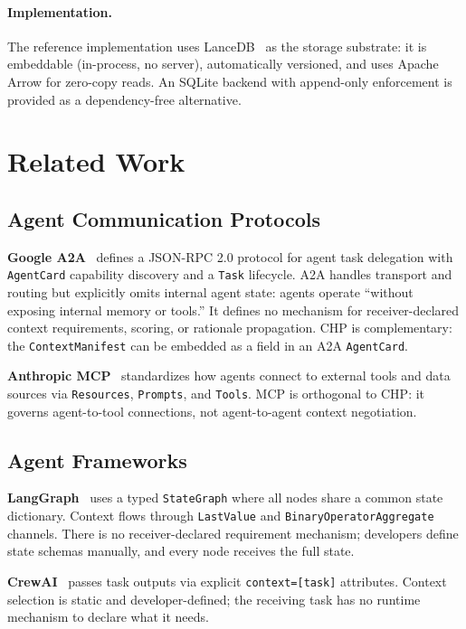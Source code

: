 \documentclass[11pt]{article}
\begin{document}
\paragraph{Implementation.}
The reference implementation uses LanceDB~\cite{lancedb} as the
storage substrate: it is embeddable (in-process, no server), automatically
versioned, and uses Apache Arrow for zero-copy reads. An SQLite backend
with append-only enforcement is provided as a dependency-free alternative.

\section{Related Work}
\label{sec:related}

\subsection{Agent Communication Protocols}

\textbf{Google A2A}~\cite{google_a2a_2025} defines a JSON-RPC 2.0 protocol
for agent task delegation with \texttt{AgentCard} capability discovery and
a \texttt{Task} lifecycle. A2A handles transport and routing but explicitly
omits internal agent state: agents operate ``without exposing internal
memory or tools.'' It defines no mechanism for receiver-declared context
requirements, scoring, or rationale propagation. CHP is complementary: the
\texttt{ContextManifest} can be embedded as a field in an A2A
\texttt{AgentCard}.

\textbf{Anthropic MCP}~\cite{anthropic_mcp_2024} standardizes how agents
connect to external tools and data sources via \texttt{Resources},
\texttt{Prompts}, and \texttt{Tools}. MCP is orthogonal to CHP: it governs
agent-to-tool connections, not agent-to-agent context negotiation.

\subsection{Agent Frameworks}

\textbf{LangGraph}~\cite{langgraph} uses a typed \texttt{StateGraph} where
all nodes share a common state dictionary. Context flows through
\texttt{LastValue} and \texttt{BinaryOperatorAggregate} channels. There is
no receiver-declared requirement mechanism; developers define state schemas
manually, and every node receives the full state.

\textbf{CrewAI}~\cite{crewai} passes task outputs via explicit
\texttt{context=[task]} attributes. Context selection is static and
developer-defined; the receiving task has no runtime mechanism to declare
what it needs.
\end{document}
